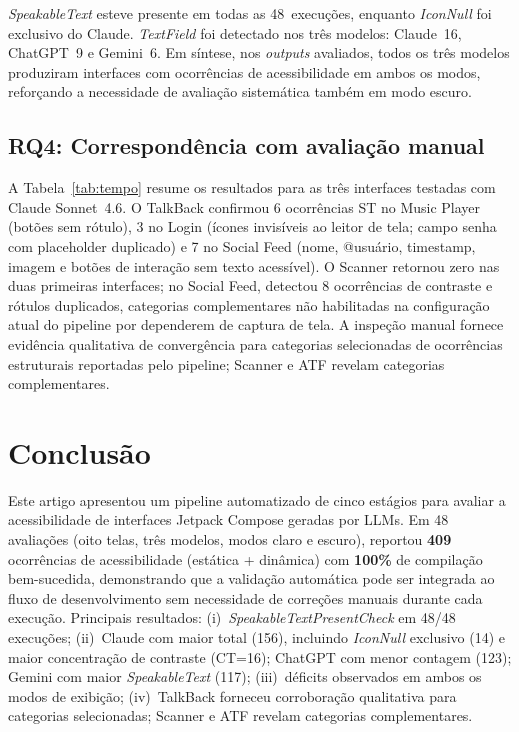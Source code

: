 \documentclass[sigconf,review]{webmedia}
\begin{document}
\textit{SpeakableText} esteve presente em todas as 48~execuções, enquanto
\textit{IconNull} foi exclusivo do Claude. \textit{TextField} foi detectado
nos três modelos: Claude~16, ChatGPT~9 e Gemini~6.
Em síntese, nos \textit{outputs} avaliados, todos os três modelos
produziram interfaces com ocorrências de acessibilidade em ambos os modos,
reforçando a necessidade de avaliação sistemática também em modo escuro.

\subsection{RQ4: Correspondência com avaliação manual}

A Tabela~\ref{tab:tempo} resume os resultados para as três interfaces
testadas com Claude Sonnet~4.6. O TalkBack confirmou 6 ocorrências ST no
Music Player (botões sem rótulo), 3 no Login (ícones invisíveis ao leitor de
tela; campo senha com placeholder duplicado) e 7 no Social Feed (nome,
@usuário, timestamp, imagem e botões de interação sem texto acessível).
O Scanner retornou zero nas duas primeiras interfaces; no Social Feed,
detectou 8 ocorrências de contraste e rótulos duplicados, categorias
complementares não habilitadas na configuração atual do pipeline por
dependerem de captura de tela. A inspeção manual fornece evidência qualitativa de convergência para
categorias selecionadas de ocorrências estruturais reportadas pelo pipeline;
Scanner e ATF revelam categorias complementares.

\section{Conclusão}
\label{sec:conclusao}

Este artigo apresentou um pipeline automatizado de cinco estágios para
avaliar a acessibilidade de interfaces Jetpack Compose geradas por LLMs.
Em 48 avaliações (oito telas, três modelos, modos claro e escuro),
reportou \textbf{409} ocorrências de acessibilidade (estática + dinâmica)
com \textbf{100\%} de compilação bem-sucedida, demonstrando que a validação
automática pode ser integrada ao fluxo de desenvolvimento sem necessidade
de correções manuais durante cada execução. Principais resultados:
(i)~\textit{SpeakableTextPresentCheck} em 48/48 execuções;
(ii)~Claude com maior total (156), incluindo \textit{IconNull} exclusivo (14)
e maior concentração de contraste (CT=16); ChatGPT com menor contagem (123);
Gemini com maior \textit{SpeakableText} (117);
(iii)~déficits observados em ambos os modos de exibição;
(iv)~TalkBack forneceu corroboração qualitativa para categorias selecionadas;
Scanner e ATF revelam categorias complementares.
\end{document}
